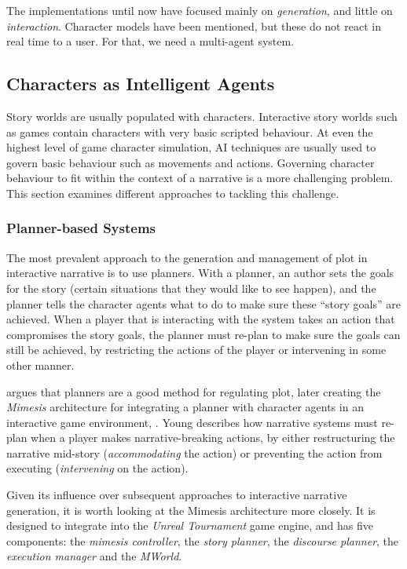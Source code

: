 \documentclass[11pt]{report}
\begin{document}
The implementations until now have focused mainly on \emph{generation\/}, and little on \emph{interaction\/}. Character models have been mentioned, but these do not react in real time to a user. For that, we need a multi-agent system.

\subsection{Characters as Intelligent Agents}
Story worlds are usually populated with characters. Interactive story worlds
such as games contain characters with very basic scripted behaviour. At even the
highest level of game character simulation, AI techniques are usually used to
govern basic behaviour such as movements and actions. Governing character
behaviour to fit within the context of a narrative is a more challenging
problem. This section examines different approaches to tackling this challenge.

\subsubsection{Planner-based Systems}
\label{sec:planner-systems}
The most prevalent approach to the generation and management of plot in
interactive narrative is to use planners. With a planner, an author sets the
goals for the story (certain situations that they would like to see happen), and
the planner tells the character agents what to do to make sure these ``story
goals'' are achieved. When a player that is interacting with the system takes an
action that compromises the story goals, the planner must re-plan to make sure
the goals can still be achieved, by restricting the actions of the player or
intervening in some other manner.

\citet{young1999notes} argues that planners are a good method for regulating
plot, later creating the \emph{Mimesis} architecture for integrating a planner with character agents in an interactive game environment, \citep{young2004architecture}. Young describes how narrative systems must re-plan when a player makes  narrative-breaking actions, by either restructuring the narrative mid-story (\emph{accommodating} the action) or preventing the action from executing (\emph{intervening} on the action).

Given its influence over subsequent approaches to interactive narrative
generation, it is worth looking at the Mimesis architecture more closely.
It is designed to integrate into the \emph{Unreal
  Tournament} game engine, and has five components: the \emph{mimesis
  controller}, the \emph{story planner}, the \emph{discourse planner}, the
\emph{execution manager} and the \emph{MWorld}.
\end{document}
